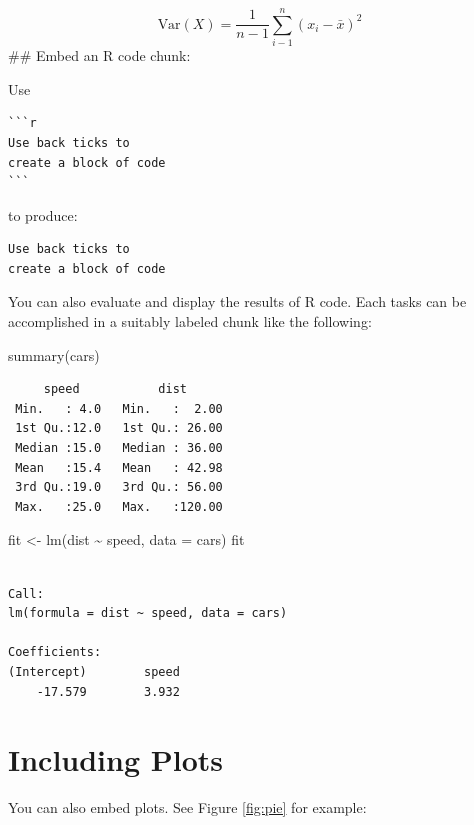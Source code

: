 \documentclass[
]{book}
\newenvironment{Shaded}{\begin{snugshade}}{\end{snugshade}}
\newcommand{\AttributeTok}[1]{\textcolor[rgb]{0.77,0.63,0.00}{#1}}
\newcommand{\FunctionTok}[1]{\textcolor[rgb]{0.00,0.00,0.00}{#1}}
\newcommand{\NormalTok}[1]{#1}
\newcommand{\OtherTok}[1]{\textcolor[rgb]{0.56,0.35,0.01}{#1}}
\newcommand{\SpecialCharTok}[1]{\textcolor[rgb]{0.00,0.00,0.00}{#1}}
\begin{document}
\[\text{Var}(X) = \frac{1}{n-1}\sum_{i-1}^{n} (x_{i} - \bar{x})^2 \]
\#\# Embed an R code chunk:

Use

\begin{verbatim}
```r
Use back ticks to 
create a block of code
```
\end{verbatim}

to produce:

\begin{verbatim}
Use back ticks to 
create a block of code
\end{verbatim}

You can also evaluate and display the results of R code. Each tasks can be accomplished in a suitably labeled chunk like the following:

\begin{Shaded}
\begin{Highlighting}[]
\FunctionTok{summary}\NormalTok{(cars)}
\end{Highlighting}
\end{Shaded}

\begin{verbatim}
     speed           dist       
 Min.   : 4.0   Min.   :  2.00  
 1st Qu.:12.0   1st Qu.: 26.00  
 Median :15.0   Median : 36.00  
 Mean   :15.4   Mean   : 42.98  
 3rd Qu.:19.0   3rd Qu.: 56.00  
 Max.   :25.0   Max.   :120.00  
\end{verbatim}

\begin{Shaded}
\begin{Highlighting}[]
\NormalTok{fit }\OtherTok{\textless{}{-}} \FunctionTok{lm}\NormalTok{(dist }\SpecialCharTok{\textasciitilde{}}\NormalTok{ speed, }\AttributeTok{data =}\NormalTok{ cars)}
\NormalTok{fit}
\end{Highlighting}
\end{Shaded}

\begin{verbatim}

Call:
lm(formula = dist ~ speed, data = cars)

Coefficients:
(Intercept)        speed  
    -17.579        3.932  
\end{verbatim}

\hypertarget{including-plots}{%
\section{Including Plots}\label{including-plots}}

You can also embed plots. See Figure \ref{fig:pie} for example:
\end{document}
